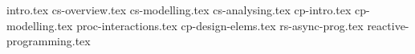 \documentclass[12pt, a4paper]{scrreprt}
\begin{document}
\makefront{}

\begingroup
    \hypersetup{linkbordercolor=white, linkcolor=black} 
    \tableofcontents

    \newpage
\endgroup

{intro.tex}
%
{cs-overview.tex}
%
{cs-modelling.tex}
%
{cs-analysing.tex}
%
{cp-intro.tex}
%
{cp-modelling.tex}
%
{proc-interactions.tex}
%
{cp-design-elems.tex}
%
{rs-async-prog.tex}
%
{reactive-programming.tex}
%
\end{document}
